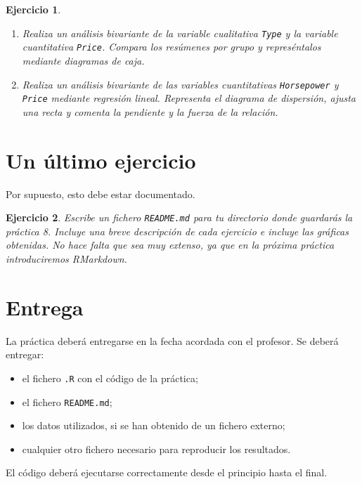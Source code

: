 \documentclass[11pt,a4paper]{article}
\theoremstyle{exercise}
\newtheorem{exercise}{Ejercicio}
\begin{document}
\begin{exercise}
\begin{enumerate}
	\item Realiza un análisis bivariante de la variable cualitativa \texttt{Type} y la variable cuantitativa \texttt{Price}. Compara los resúmenes por grupo y represéntalos mediante diagramas de caja.

	\item Realiza un análisis bivariante de las variables cuantitativas \texttt{Horsepower} y \texttt{Price} mediante regresión lineal. Representa el diagrama de dispersión, ajusta una recta y comenta la pendiente y la fuerza de la relación.
	\end{enumerate}
\end{exercise}


\section{Un último ejercicio}


Por supuesto, esto debe estar documentado.

\begin{exercise} Escribe un fichero \texttt{README.md} para tu directorio donde guardarás la práctica 8. Incluye una breve descripción de cada ejercicio e incluye las gráficas obtenidas. No hace falta que sea muy extenso, ya que en la próxima práctica introduciremos RMarkdown. 
\end{exercise}



\section*{Entrega}

La práctica deberá entregarse en la fecha acordada con el profesor. Se deberá entregar:
\begin{itemize}
\item el fichero \texttt{.R} con el código de la práctica;
\item el fichero \texttt{README.md};
\item los datos utilizados, si se han obtenido de un fichero externo;
\item cualquier otro fichero necesario para reproducir los resultados.
\end{itemize}
El código deberá ejecutarse correctamente desde el principio hasta el final.
\end{document}
